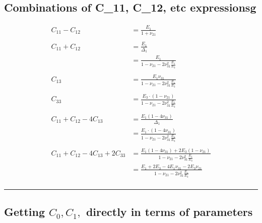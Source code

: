 \documentclass{article}
\begin{document}
\subsection{Combinations of C_{11}, C_{12}, etc expressionsg
}
\begin{align}
C_{11}-C_{12}
&=\frac{E_1}{1+\nu_{21}} \\
\\
C_{11}+C_{12}
&=\frac{E_1}{\Delta_1} \\
&=\frac{E_1}{ 1-\nu_{21}-2\nu_{31}^2\frac{E_1}{E_3} } \\
\\
C_{13} 
&= \frac{E_1 \nu_{31}}{ 1-\nu_{21}-2\nu_{31}^2\frac{E_1}{E_3} }  \\
\\
C_{33} 
&= \frac{ E_3 \cdot \left( 1-\nu_{21} \right) }{ 1-\nu_{21}-2\nu_{31}^2\frac{E_1}{E_3} }  \\
\\
C_{11}+C_{12}-4C_{13} 
&= \frac{E_1 \left(1-4\nu_{31} \right)}{\Delta_1}  \\
&= \frac{E_1 \cdot \left(1-4\nu_{31} \right)}{ 1-\nu_{21}-2\nu_{31}^2\frac{E_1}{E_3} }  \\
\\
C_{11}+C_{12}-4C_{13}+2C_{33} 
&= \frac{E_1 \left(1-4\nu_{31} \right) + 2 E_3 \left( 1-\nu_{21} \right) }{ 1-\nu_{21}-2\nu_{31}^2\frac{E_1}{E_3} }  \\
&= \frac{E_1+2E_3 -4 E_1 \nu_{31} - 2E_3 \nu_{21} }{ 1-\nu_{21}-2\nu_{31}^2\frac{E_1}{E_3} }  \\
\end{align}

\noindent\rule{8cm}{0.4pt}

\subsection{Getting $C_0, C_1,$ directly in terms of parameters}
\end{document}
